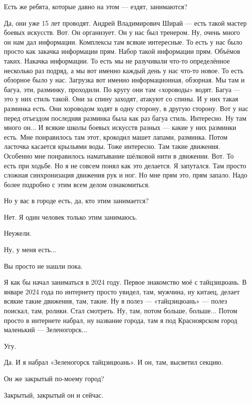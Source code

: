 \A
Есть же ребята, которые давно на этом --- ездят, занимаются?

\I
Да, они уже 15 лет проводят.
Андрей Владимирович Ширай --- есть
такой мастер боевых искусств.
Вот.
Он организует.
Он у нас был тренером.
Ну, очень много он нам дал информации.
Комплексы там всякие интересные.
То есть у нас было просто как закачка информации прям.
Набор такой информации прям.
Объёмов таких.
Накачка информации.
То есть мы не разучивали что-то определённое несколько раз подряд,
а мы вот именно каждый день у нас что-то новое.
То есть обзорное было у нас.
Загрузка вот именно информационная, обзорная.
Мы там и багуа, эти, разминку, проходили. По кругу
они там «хороводы» водят.
Багуа --- это у них стиль такой.
Они за спину заходят, атакуют со спины.
И у них такая разминка есть.
Они хороводом ходят в одну сторону, в другую сторону.
Вот у нас перед отъездом последняя разминка была как раз багуа стиль.
Интересно.
Ну там много он... И всякие школы боевых искусств разных --- какие у них разминки есть.
Мне понравилось там этот, крокодил машет лапами, разминка.
Потом ласточка касается крыльями воды.
Тоже интересно.
Там такие движения.
Особенно мне понравилось наматывание шёлковой нити в движении.
Вот.
То есть при ходьбе.
Но я не совсем понял как это делается.
Я запутался.
Там просто сложная синхронизация движения рук и ног.
Но мне прям это, прям запало.
Надо более подробно с этим всем делом ознакомиться.

\A
Но у вас в городе есть, да, кто этим занимается?

\I
Нет.
Я один человек только этим занимаюсь.

\A
Неужели.

\I
Ну, у меня есть...

\A
Вы просто не нашли пока.

\I
Я как бы начал заниматься в 2024 году.
Первое знакомство моё с тайцзицюань.
В январе
2024 года по интернету просто увидел, там,
мужчина, ну китаец, делает всякие такие движения, там, такие.
Ну я полез --- «тайцзицюань» --- полез поискал, там, ролики. Стал смотреть.
Ну, там, потом больше, больше... Потом просто в интернете набрал, ну название города, там я под
Красноярском город маленький --- Зеленогорск...

\A
Угу.

\I
Да. И я набрал «Зеленогорск тайцзицюань».
И он, там, высветил секцию.

\A
Он же закрытый по-моему город?

\I
Закрытый, закрытый он и сейчас.


